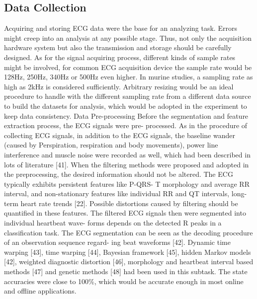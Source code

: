 \documentclass[journal]{IEEEtran}
\begin{document}
\subsection{Data Collection}
Acquiring and storing ECG data were the base for an analyzing task. Errors might creep into an analysis at any possible stage. Thus, not only the acquisition hardware system but also the transmission and storage should be carefully designed. As for the signal acquiring process, different kinds of sample rates might be involved, for common ECG acquisition device the sample rate would be 128Hz, 250Hz, 340Hz or 500Hz even higher. In murine studies, a sampling rate as high as 2kHz is considered sufficiently. Arbitrary resizing would be an ideal procedure to handle with the different sampling rate from a different data source to build the datasets for analysis, which would be adopted in the experiment to keep data consistency.
Data Pre-processing
Before the segmentation and feature extraction process, the ECG signals were pre- processed. As in the procedure of collecting ECG signals, in addition to the ECG signals, the baseline wander (caused by Perspiration, respiration and body movements), power line interference and muscle noise were recorded as well, which had been described in lots of literature [41]. When the filtering methods were proposed and adopted in the preprocessing, the desired information should not be altered. The ECG typically exhibits persistent features like P-QRS- T morphology and average RR interval, and non-stationary features like individual RR and QT intervals, long-term heart rate trends [22]. Possible distortions caused by filtering should be quantified in these features.
The filtered ECG signals then were segmented into individual heartbeat wave- forms depends on the detected R peaks in a classification task. The ECG segmentation can be seen as the decoding procedure of an observation sequence regard- ing beat waveforms [42]. Dynamic time warping [43], time warping [44], Bayesian framework [45], hidden Markov models [42], weighted diagnostic distortion [46], morphology and heartbeat interval based methods [47] and genetic methods [48] had been used in this subtask. The state accuracies were close to 100\%, which would be accurate enough in most online and offline applications.
\end{document}
